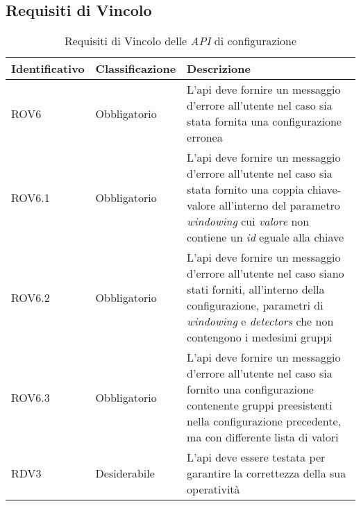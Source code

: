 \subsection{Requisiti di Vincolo}
{
\centering
\begin{longtable}{L{3cm} L{3cm} L{7.5cm}}
\caption{Requisiti di Vincolo delle \textit{API} di configurazione}\\
\textbf{Identificativo} &
\textbf{Classificazione}&
\textbf{Descrizione}\\
\endhead
\hline
ROV6 & Obbligatorio & L'\gls{api} deve fornire un messaggio d'errore all'utente nel caso sia stata fornita una configurazione erronea\\
\hline
ROV6.1 & Obbligatorio & L'\gls{api} deve fornire un messaggio d'errore all'utente nel caso sia stata fornito una coppia chiave-valore all'interno del parametro \textit{windowing} cui \textit{valore} non contiene un \textit{id} eguale alla chiave\\
\hline
ROV6.2 & Obbligatorio & L'\gls{api} deve fornire un messaggio d'errore all'utente nel caso siano stati forniti, all'interno della configurazione, parametri di \textit{windowing} e \textit{detectors} che non contengono i medesimi gruppi\\
\hline
ROV6.3 & Obbligatorio & L'\gls{api} deve fornire un messaggio d'errore all'utente nel caso sia fornito una configurazione contenente gruppi preesistenti nella configurazione precedente, ma con differente lista di valori\\
\hline
RDV3 & Desiderabile & L'\gls{api} deve essere testata per garantire la correttezza della sua operatività\\
\hline
\end{longtable}
}


